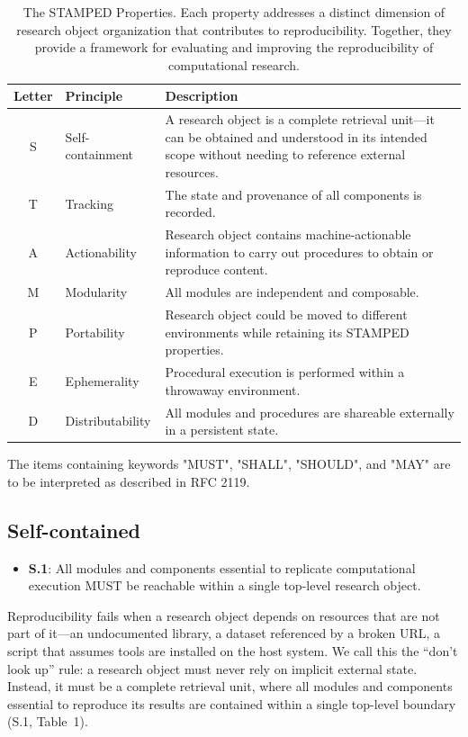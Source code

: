\documentclass{article}
\begin{document}
\begin{table}[ht]
\centering
\caption{The STAMPED Properties. Each property addresses a distinct dimension of research object organization that contributes to reproducibility. Together, they provide a framework for evaluating and improving the reproducibility of computational research.}
\label{tab:stamped}
\begin{tabular}{c l p{10cm}}
\hline
\textbf{Letter} & \textbf{Principle} & \textbf{Description} \\
\hline
S & Self-containment & A research object is a complete retrieval unit---it can be obtained and understood in its intended scope without needing to reference external resources. \\
T & Tracking & The state and provenance of all components is recorded. \\
A & Actionability & Research object contains machine-actionable information to carry out procedures to obtain or reproduce content. \\
M & Modularity & All modules are independent and composable. \\
P & Portability & Research object could be moved to different environments while retaining its STAMPED properties. \\
E & Ephemerality & Procedural execution is performed within a throwaway environment. \\
D & Distributability & All modules and procedures are shareable externally in a persistent state. \\
\hline
\end{tabular}
\end{table}

The items containing keywords "MUST", "SHALL", "SHOULD", and "MAY" are to be interpreted as described in RFC 2119\cite{bradner_key_1997}.



\subsection{Self-contained}

\begin{itemize}
    \item \textbf{S.1}: All modules and components essential to replicate computational execution MUST be reachable within a single top-level research object.
\end{itemize}

Reproducibility fails when a research object depends on resources that are not part of it---an undocumented library, a dataset referenced by a broken URL, a script that assumes tools are installed on the host system.
We call this the ``don't look up'' rule: a research object must never rely on implicit external state.
Instead, it must be a complete retrieval unit, where all modules and components essential to reproduce its results are contained within a single top-level boundary (S.1, Table~1).
\end{document}
